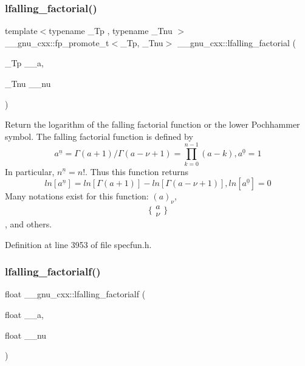 \subsubsection{\texorpdfstring{lfalling\+\_\+factorial()}{lfalling\_factorial()}}
{\footnotesize\ttfamily template$<$typename \+\_\+\+Tp , typename \+\_\+\+Tnu $>$ \\
\+\_\+\+\_\+gnu\+\_\+cxx\+::fp\+\_\+promote\+\_\+t$<$\+\_\+\+Tp, \+\_\+\+Tnu$>$ \+\_\+\+\_\+gnu\+\_\+cxx\+::lfalling\+\_\+factorial (\begin{DoxyParamCaption}\item[{\+\_\+\+Tp}]{\+\_\+\+\_\+a,  }\item[{\+\_\+\+Tnu}]{\+\_\+\+\_\+nu }\end{DoxyParamCaption})\hspace{0.3cm}{\ttfamily [inline]}}



Return the logarithm of the falling factorial function or the lower Pochhammer symbol. The falling factorial function is defined by \[ a^{\underline{n}} = \Gamma(a + 1) / \Gamma(a - \nu + 1) = \prod_{k=0}^{n-1} (a - k), a^{\underline{0}} = 1 \] In particular, $ n^{\underline{n}} = n! $. Thus this function returns \[ ln[a^{\underline{n}}] = ln[\Gamma(a + 1)] - ln[\Gamma(a - \nu + 1)], ln[a^{\underline{0}}] = 0 \] Many notations exist for this function\+: $ (a)_\nu $, \[ \{ \begin{array}{c} a \\ \nu \end{array} \} \], and others. 



Definition at line 3953 of file specfun.\+h.

\mbox{\label{group__gnu__math__spec__func_ga59ad7045c90aa1e3bc671e2eb6b8a2a7}} 
\subsubsection{\texorpdfstring{lfalling\+\_\+factorialf()}{lfalling\_factorialf()}}
{\footnotesize\ttfamily float \+\_\+\+\_\+gnu\+\_\+cxx\+::lfalling\+\_\+factorialf (\begin{DoxyParamCaption}\item[{float}]{\+\_\+\+\_\+a,  }\item[{float}]{\+\_\+\+\_\+nu }\end{DoxyParamCaption})\hspace{0.3cm}{\ttfamily [inline]}}

